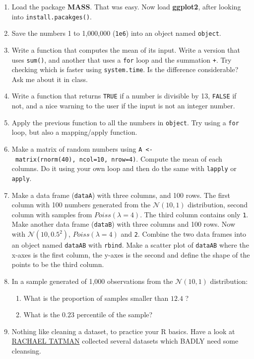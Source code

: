 \documentclass[]{book}
\providecommand{\tightlist}{%
  \setlength{\itemsep}{0pt}\setlength{\parskip}{0pt}}
\theoremstyle{definition}
\theoremstyle{definition}
\theoremstyle{definition}
\theoremstyle{remark}
\begin{document}
\begin{enumerate}
\def\labelenumi{\arabic{enumi}.}
\item
  Load the package \textbf{MASS}. That was easy. Now load
  \textbf{ggplot2}, after looking into \texttt{install.pacakges()}.
\item
  Save the numbers 1 to 1,000,000 (\texttt{1e6}) into an object named
  \texttt{object}.
\item
  Write a function that computes the mean of its input. Write a version
  that uses \texttt{sum()}, and another that uses a \texttt{for} loop
  and the summation \texttt{+}. Try checking which is faster using
  \texttt{system.time}. Is the difference considerable? Ask me about it
  in class.
\item
  Write a function that returns \texttt{TRUE} if a number is divisible
  by 13, \texttt{FALSE} if not, and a nice warning to the user if the
  input is not an integer number.
\item
  Apply the previous function to all the numbers in \texttt{object}. Try
  using a \texttt{for} loop, but also a mapping/apply function.
\item
  Make a matrix of random numbers using
  \texttt{A\ \textless{}-\ matrix(rnorm(40),\ ncol=10,\ nrow=4)}.
  Compute the mean of each columns. Do it using your own loop and then
  do the same with \texttt{lapply} or \texttt{apply}.
\item
  Make a data frame (\texttt{dataA}) with three columns, and 100 rows.
  The first column with 100 numbers generated from the
  \(\mathcal{N}(10,1)\) distribution, second column with samples from
  \(Poiss(\lambda=4)\). The third column contains only \texttt{1}.\\
  Make another data frame (\texttt{dataB}) with three columns and 100
  rows. Now with \(\mathcal{N}(10,0.5^2)\), \(Poiss(\lambda=4)\) and
  \texttt{2}. Combine the two data frames into an object named
  \texttt{dataAB} with \texttt{rbind}. Make a scatter plot of
  \texttt{dataAB} where the x-axes is the first column, the y-axes is
  the second and define the shape of the points to be the third column.
\item
  In a sample generated of 1,000 observations from the
  \(\mathcal{N}(10,1)\) distribution:

  \begin{enumerate}
  \def\labelenumii{\arabic{enumii}.}
  \tightlist
  \item
    What is the proportion of samples smaller than \(12.4\) ?
  \item
    What is the \(0.23\) percentile of the sample?
  \end{enumerate}
\item
  Nothing like cleaning a dataset, to practice your R basics. Have a
  look at
  \href{https://makingnoiseandhearingthings.com/2018/04/19/datasets-for-data-cleaning-practice/}{RACHAEL
  TATMAN} collected several datasets which BADLY need some cleansing.
\end{enumerate}
\end{document}
